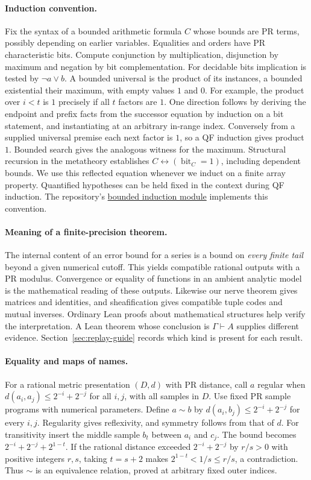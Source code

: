 \documentclass[11pt,letterpaper]{article}
\newcommand{\bit}{\operatorname{bit}}
\newcommand{\repo}[2]{\href{https://github.com/VladimirReshetnikov/ProveIt/blob/3ee850b4c2d650cf01263823fd5415963747c5d0/Logic/PrimitiveRecursiveArithmetic/#1}{#2}}
\begin{document}
\paragraph{Induction convention.}
Fix the syntax of a bounded arithmetic formula $C$ whose bounds are PR terms, possibly depending on earlier variables. Equalities and orders have PR characteristic bits. Compute conjunction by multiplication, disjunction by maximum and negation by bit complementation. For decidable bits implication is tested by $\neg a\lor b$. A bounded universal is the product of its instances, a bounded existential their maximum, with empty values $1$ and $0$. For example, the product over $i<t$ is $1$ precisely if all $t$ factors are $1$. One direction follows by deriving the endpoint and prefix facts from the successor equation by induction on a bit statement, and instantiating at an arbitrary in-range index. Conversely from a supplied universal premise each next factor is $1$, so a QF induction gives product $1$. Bounded search gives the analogous witness for the maximum. Structural recursion in the metatheory establishes $C\leftrightarrow(\bit_C=1)$, including dependent bounds. We use this reflected equation whenever we induct on a finite array property. Quantified hypotheses can be held fixed in the context during QF induction. The repository's \repo{Derivations/Lean/IPRADerivations/Foundations/BoundedSyntaxInduction.lean}{bounded induction module} implements this convention.

\paragraph{Meaning of a finite-precision theorem.}
The internal content of an error bound for a series is a bound on \emph{every finite tail} beyond a given numerical cutoff. This yields compatible rational outputs with a PR modulus. Convergence or equality of functions in an ambient analytic model is the mathematical reading of these outputs. Likewise our nerve theorem gives matrices and identities, and sheafification gives compatible tuple codes and mutual inverses. Ordinary Lean proofs about mathematical structures help verify the interpretation. A Lean theorem whose conclusion is $\Gamma\vdash A$ supplies different evidence. Section~\ref{sec:replay-guide} records which kind is present for each result.


\paragraph{Equality and maps of names.}
For a rational metric presentation $(D,d)$ with PR distance, call $a$ regular when
$d(a_i,a_j)\le 2^{-i}+2^{-j}$ for all $i,j$, with all samples in $D$.
Use fixed PR sample programs with numerical parameters. Define $a\sim b$ by
$d(a_i,b_j)\le 2^{-i}+2^{-j}$ for every $i,j$. Regularity gives reflexivity, and symmetry follows from that of $d$. For transitivity insert the middle sample $b_t$ between $a_i$ and $c_j$. The bound becomes $2^{-i}+2^{-j}+2^{1-t}$. If the rational distance exceeded $2^{-i}+2^{-j}$ by $r/s>0$ with positive integers $r,s$, taking $t=s+2$ makes $2^{1-t}<1/s\le r/s$, a contradiction. Thus $\sim$ is an equivalence relation, proved at arbitrary fixed outer indices.
\end{document}
